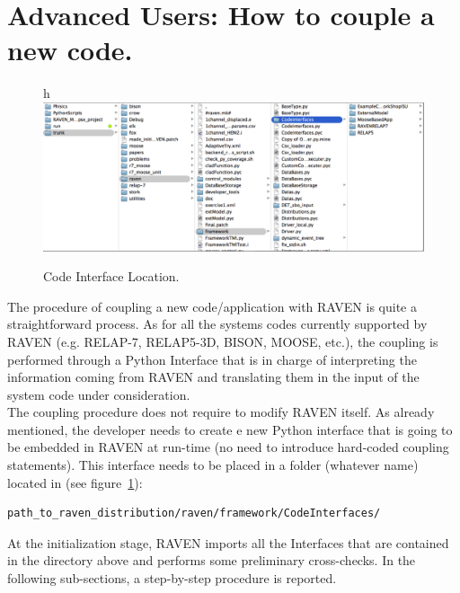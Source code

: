 \section{Advanced Users: How to couple a new code.  \\ \vspace{2 mm} {\small }}
\label{sec:newCodeCoupling}
\begin{figure}{h}
\centering
\includegraphics[width=1.0\textwidth]{pics/CodeInterfaceLocation.png}
\caption{Code Interface Location.}
\label{fig:codeinterface}
\end{figure}
The procedure of coupling a new code/application with RAVEN is quite a straightforward process. 
As for all the systems codes currently supported by RAVEN (e.g. RELAP-7, RELAP5-3D, 
BISON, MOOSE, etc.), the coupling is performed through a Python Interface that is in
 charge of interpreting the information coming from RAVEN and translating them in the
  input of the system code under consideration. 
\\The coupling procedure does not require to modify RAVEN itself. As already mentioned,
 the developer needs to create e new Python interface that is going to be embedded 
 in RAVEN at run-time (no need to introduce  hard-coded coupling statements). 
 This interface needs to be placed in a folder (whatever name) located in (see figure~\ref{fig:codeinterface}):
\begin{lstlisting}[language=bash]
 path_to_raven_distribution/raven/framework/CodeInterfaces/
\end{lstlisting}
At the initialization stage, RAVEN imports all the Interfaces that are contained in the directory above and performs some preliminary cross-checks.
In the following sub-sections, a step-by-step procedure is reported.
